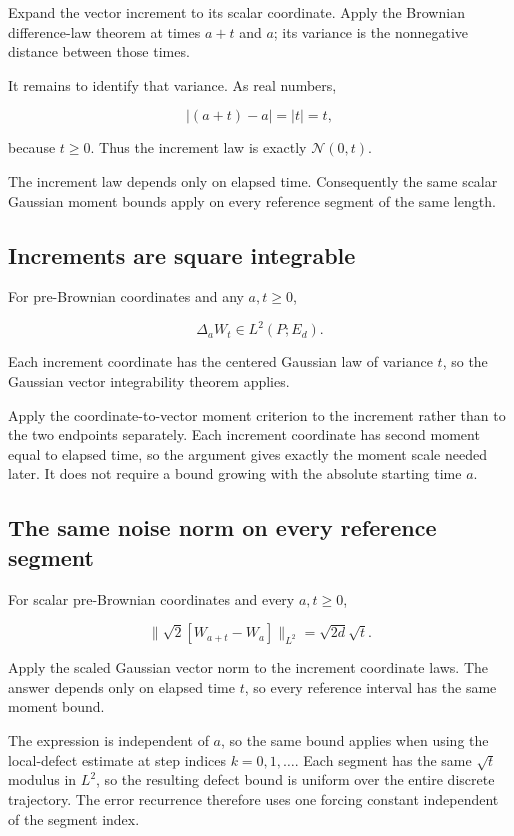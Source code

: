 \documentclass[11pt,a4paper]{article}
\begin{document}
Expand the vector increment to its scalar coordinate. Apply the Brownian difference-law theorem at times \(a+t\) and \(a\); its variance is the nonnegative distance between those times.



It remains to identify that variance. As real numbers,

\[|(a+t)-a|=|t|=t,\]

because \(t\ge0\). Thus the increment law is exactly \(\mathcal N(0,t)\).



The increment law depends only on elapsed time. Consequently the same scalar Gaussian moment bounds apply on every reference segment of the same length.


\subsection{\texorpdfstring{Increments are square integrable}{Increments are square integrable}}


For pre-Brownian coordinates and any \(a,t\ge0\),

\[\Delta_aW_t\in L^2(P;E_d).\]

Each increment coordinate has the centered Gaussian law of variance \(t\), so the Gaussian vector integrability theorem applies.



Apply the coordinate-to-vector moment criterion to the increment rather than to the two endpoints separately. Each increment coordinate has second moment equal to elapsed time, so the argument gives exactly the moment scale needed later. It does not require a bound growing with the absolute starting time \(a\).


\subsection{\texorpdfstring{The same noise norm on every reference segment}{The same noise norm on every reference segment}}


For scalar pre-Brownian coordinates and every \(a,t\ge0\),

\[\boxed{\|\sqrt2[W_{a+t}-W_a]\|_{L^2}=\sqrt{2d}\sqrt t.}\]

Apply the scaled Gaussian vector norm to the increment coordinate laws. The answer depends only on elapsed time \(t\), so every reference interval has the same moment bound.



The expression is independent of \(a\), so the same bound applies when using the local-defect estimate at step indices \(k=0,1,\ldots\). Each segment has the same \(\sqrt t\) modulus in \(L^2\), so the resulting defect bound is uniform over the entire discrete trajectory. The error recurrence therefore uses one forcing constant independent of the segment index.
\end{document}

